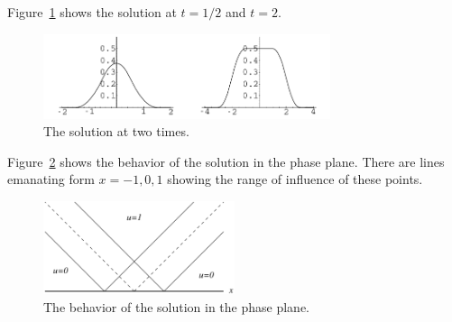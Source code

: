 {\begin{Solution}
\begin{enumerate}
    Figure~\ref{ut12t2} shows the solution at $t = 1/2$ and $t = 2$.
    \begin{figure}[h!]
      \begin{center}
        \includegraphics[width=0.75\textwidth]{pde/green/ut12t2}
      \end{center}
      \caption{The solution at two times.}
      \label{ut12t2}
    \end{figure}

    Figure~\ref{phaseplaneutf} shows the behavior of the solution 
    in the phase plane.  There are lines emanating form $x = -1,0,1$ showing
    the range of influence of these points.
    \begin{figure}[h!]
      \begin{center}
        \includegraphics[width=0.5\textwidth]{pde/green/phaseplaneutf}
      \end{center}
      \caption{The behavior of the solution in the phase plane.}
      \label{phaseplaneutf}
    \end{figure}
  \end{enumerate}
\end{Solution}









}
